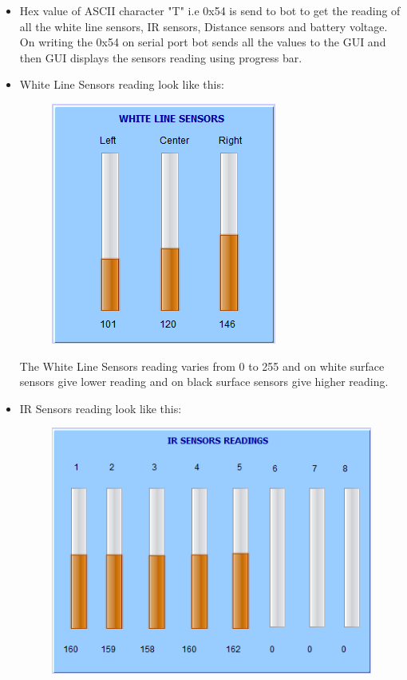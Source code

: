 \documentclass{article}
\begin{document}
\begin{enumerate}
\begin{itemize}
\begin{itemize}
				\item  Hex value of ASCII character "T" i.e 0x54 is send to bot to get the reading of all the white line sensors, IR sensors, Distance sensors and battery voltage. On writing the 0x54 on serial port bot sends all the values to the GUI and then GUI displays the sensors reading  using progress bar.
				\item White Line Sensors reading look like this: \\
				\begin{figure}[h]
					\begin{center}
						\includegraphics[scale=1]{whitelinesensor.png}
					\end{center}
				\end{figure}
				The White Line Sensors reading varies from 0 to 255 and on white surface sensors give lower reading and on black surface sensors give higher reading.
				\newpage
				\item IR Sensors reading look like this: \\ 
				\begin{figure}[h]
					\begin{center}
						\includegraphics[scale=0.75]{irsensor.png}

\end{center}
\end{figure}
\end{itemize}
\end{itemize}
\end{enumerate}
\end{document}
